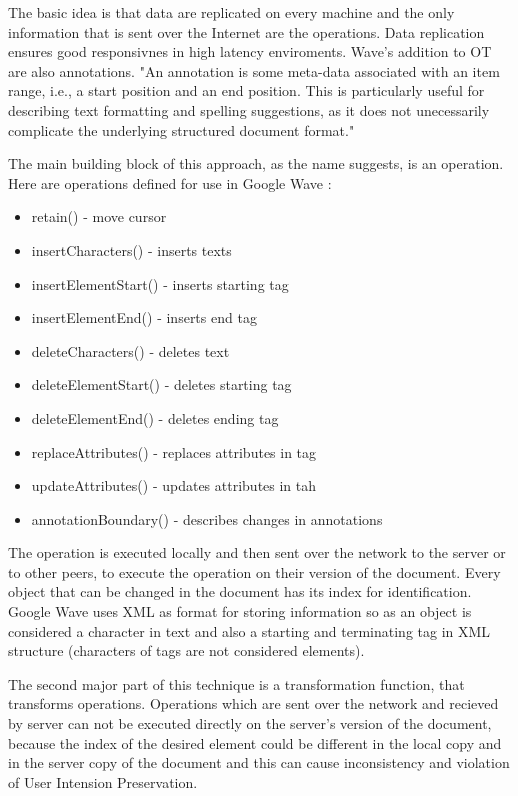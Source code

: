\documentclass[12pt,oneside]{fithesis2}
\begin{document}
\par The basic idea is that data are replicated on every machine and the only information that is sent over the Internet are the operations. Data replication ensures good responsivnes in high latency enviroments. Wave's addition to OT are also annotations. "An annotation is some meta-data associated with an item range, i.e., a start position and an end position. This is particularly useful for describing text formatting and spelling suggestions, as it does not unecessarily complicate the underlying structured document format." \cite{Google} \par The main building block of this approach, as the name suggests, is an operation. Here are operations defined for use in Google Wave \cite{Google}:
\begin{itemize}
\item retain() - move cursor
\item insertCharacters() - inserts texts
\item insertElementStart() - inserts starting tag
\item insertElementEnd() - inserts end tag
\item deleteCharacters() - deletes text
\item deleteElementStart() - deletes starting tag
\item deleteElementEnd() - deletes ending tag
\item replaceAttributes() - replaces attributes in tag
\item updateAttributes() - updates attributes in tah
\item annotationBoundary() - describes changes in annotations
\end{itemize}
\par The operation is executed locally and then sent over the network to the server or to other peers, to execute the operation on their version of the document. Every object that can be changed in the document has its index for identification. Google Wave uses XML as format for storing information so as an object is considered a character in text and also a starting and terminating tag in XML structure (characters of tags are not considered elements). 
\par The second major part of this technique is a transformation function, that transforms operations. Operations which are sent over the network and recieved by server can not be executed directly on the server's version of the document, because the index of the desired element could be different in the local copy and in the server copy of the document and this can cause inconsistency and violation of User Intension Preservation. 
\end{document}
